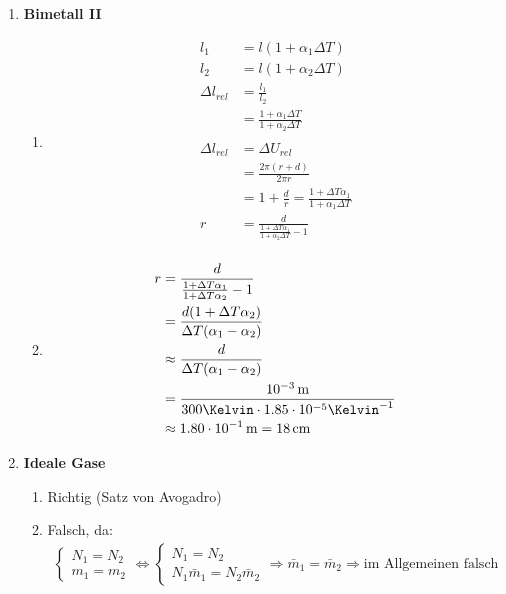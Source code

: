 \documentclass[11pt,letterpaper]{article}
\begin{document}
\begin{enumerate}
    \item \textbf{Bimetall II}
    \begin{enumerate}
        \item 
            \begin{align*}
                l_1 &= l(1+\alpha_1 \Delta T)\\
                l_2 &= l(1+\alpha_2 \Delta T)\\ 
                \Delta l_{rel} &= \frac{l_1}{l_2}\\
                &= \frac{1+\alpha_1 \Delta T}{1+\alpha_2\Delta T }\\
                \\
                \Delta l_{rel} &= \Delta U_{rel}\\
                &= \frac{2\pi(r+d)}{2\pi r} \\
                &= 1+ \frac{d}{r}=\frac{1+\Delta T \alpha_1}{1+\alpha_1\Delta T}\\
                r &= \frac{d}{\frac{1+\Delta T \alpha_1}{1+\alpha_2\Delta T }-1}\\  
            \end{align*}
        \item 
            \begin{align*}
                r &= \frac{d}{\frac{1+\Delta T \alpha_1}{1+\Delta T \alpha_2}-1}\\
                &= \frac{d({1+\Delta T \alpha_2})}{\Delta T (\alpha_1-\alpha_2)}\\ 
                &\approx \frac{d}{\Delta T (\alpha_1-\alpha_2)}\\
                &= \frac{10^{-3}\,\mathrm{m}}{300\Kelvin \cdot 1.85\cdot 10^{-5}\Kelvin^{-1}}\\
                &\approx 1.80 \cdot 10^{-1} \,\mathrm{m} = 18\,\mathrm{cm}\\
            \end{align*}
    \end{enumerate}

    \item \textbf{Ideale Gase}
    \begin{enumerate}
        \item Richtig (Satz von Avogadro)
        \item Falsch, da:
            \begin{align*}
                \begin{cases}
                     N_1 = N_2\\m_1=m_2
                \end{cases}\Longleftrightarrow 
                \begin{cases}
                    N_1 = N_2\\N_1\bar{m}_1=N_2 \bar{m}_2
                \end{cases}
                \Longrightarrow \bar{m}_1 = \bar{m}_2
                \Longrightarrow \text{im Allgemeinen falsch}
            \end{align*}
            

\end{enumerate}
\end{enumerate}
\end{document}
